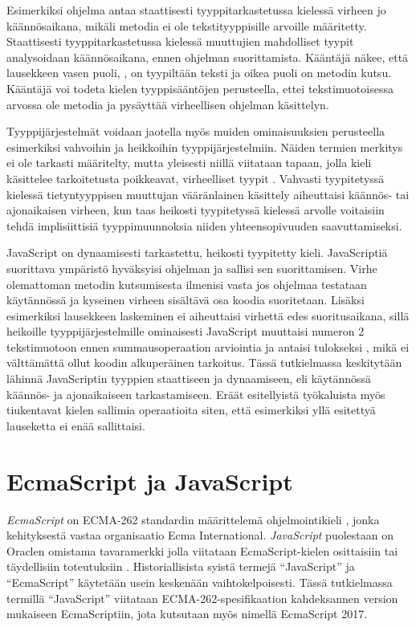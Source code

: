 Esimerkiksi ohjelma  antaa
staattisesti tyyppitarkastetussa kielessä virheen jo käännösaikana, mikäli
metodia  ei ole tekstityyppisille arvoille määritetty.
Staattisesti tyyppitarkastetussa kielessä muuttujien
mahdolliset tyypit analysoidaan käännösaikana, ennen ohjelman suorittamista.
Kääntäjä näkee, että lausekkeen vasen puoli, ,
on tyypiltään teksti ja oikea puoli on metodin  kutsu.
Kääntäjä voi todeta kielen tyyppisääntöjen perusteella, ettei
tekstimuotoisessa arvossa ole metodia  ja
pysäyttää virheellisen ohjelman käsittelyn.

Tyyppijärjestelmät voidaan jaotella myös muiden
ominaisuuksien perusteella esimerkiksi vahvoihin ja heikkoihin
tyyppijärjestelmiin. Näiden termien merkitys ei ole tarkasti määritelty,
mutta yleisesti niillä viitataan tapaan, jolla kieli käsittelee tarkoitetusta
poikkeavat, virheelliset tyypit \cite{CornellTransitionToOO}. Vahvasti
tyypitetyssä kielessä tietyntyyppisen muuttujan vääränlainen käsittely
aiheuttaisi käännös- tai ajonaikaisen virheen, kun taas heikosti tyypitetyssä
kielessä arvolle voitaisiin tehdä implisiittisiä tyyppimuunnoksia niiden
yhteensopivuuden saavuttamiseksi.

JavaScript on dynaamisesti tarkastettu, heikosti tyypitetty kieli.
JavaScriptiä suorittava ympäristö hyväksyisi ohjelman ja sallisi
sen suorittamisen. Virhe olemattoman metodin kutsumisesta
ilmenisi vasta jos ohjelmaa testataan käytännössä ja
kyseinen virheen sisältävä osa koodia suoritetaan.
Lisäksi esimerkiksi lausekkeen 
laskeminen ei aiheuttaisi virhettä edes suoritusaikana, sillä heikoille
tyyppijärjestelmille ominaisesti JavaScript muuttaisi numeron 2 tekstimuotoon
ennen summausoperaation arviointia ja antaisi tulokseksi
, mikä ei välttämättä ollut koodin
alkuperäinen tarkoitus. Tässä tutkielmassa keskitytään lähinnä
JavaScriptin tyyppien staattiseen ja dynaamiseen, eli käytännössä
käännös- ja ajonaikaiseen tarkastamiseen. Eräät
esitellyistä työkaluista myös\newline
tiukentavat kielen sallimia operaatioita siten,
että esimerkiksi yllä esitettyä\newline
{} lauseketta
ei enää sallittaisi.

\section{EcmaScript ja JavaScript}
\textit{EcmaScript} on ECMA-262 standardin määrittelemä ohjelmointikieli
\cite{JavaScriptLanguageResources, Ecma262}, jonka kehityksestä vastaa
organisaatio Ecma International. \textit{JavaScript} puolestaan on Oraclen omistama
tavaramerkki jolla viitataan EcmaScript-kielen osittaisiin tai täydellisiin
toteutuksiin \cite{JavaScriptLanguageResources}. Historiallisista syistä termejä
``JavaScript'' ja ``EcmaScript'' käytetään usein keskenään vaihtokelpoisesti.
Tässä tutkielmassa termillä ``JavaScript'' viitataan ECMA-262-spesifikaation kahdeksannen
version mukaiseen EcmaScriptiin, jota kutsutaan myös nimellä EcmaScript 2017.

